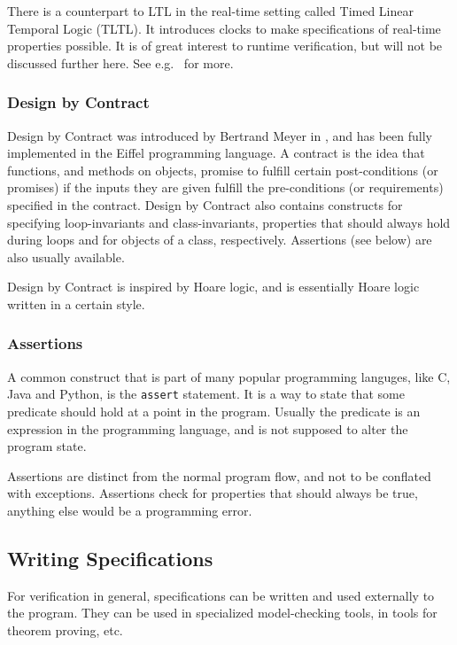\documentclass[a4paper,11pt]{kth-mag}
\begin{document}
There is a counterpart to LTL in the real-time setting called Timed Linear
Temporal Logic (TLTL). It introduces clocks to make specifications
of real-time properties possible. It is of great interest to runtime
verification, but will not be discussed further here. See e.g.\
\cite{bauer06monitoring} for more.


\subsubsection{Design by Contract}

Design by Contract was introduced by Bertrand Meyer in
\cite{meyer92applyingdbc}, and has been fully implemented in the Eiffel
programming language. A contract is the idea that functions, and methods on
objects, promise to fulfill certain post-conditions (or promises) if the inputs
they are given fulfill the pre-conditions (or requirements) specified in the
contract.  Design by Contract also contains constructs for specifying
loop-invariants and class-invariants, properties that should always hold during
loops and for objects of a class, respectively. Assertions (see below) are also
usually available.

Design by Contract is inspired by Hoare logic, and is essentially Hoare logic
written in a certain style.


\subsubsection{Assertions}

A common construct that is part of many popular programming languges, like C,
Java and Python, is the \texttt{assert} statement. It is a way to state that
some predicate should hold at a point in the program. Usually the predicate is
an expression in the programming language, and is not supposed to alter the
program state.

Assertions are distinct from the normal program flow, and not to be conflated
with exceptions. Assertions check for properties that should always be true,
anything else would be a programming error.


\subsection{Writing Specifications}

For verification in general, specifications can be written and used externally
to the program. They can be used in specialized model-checking tools, in tools
for theorem proving, etc.
\end{document}
